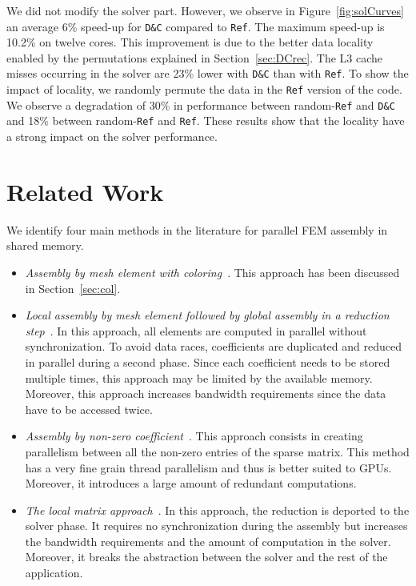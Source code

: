 \documentclass[10pt]{IOS-Book-Article}
\begin{document}
We did not modify the solver part.
However, we observe in Figure~\ref{fig:solCurves} an average 6\% speed-up for {\tt D\&C} compared to {\tt Ref}.
The maximum speed-up is 10.2\% on twelve cores.
This improvement is due to the better data locality enabled by the permutations explained in Section~\ref{sec:DCrec}.
The L3 cache misses occurring in the solver are 23\% lower with {\tt D\&C} than with {\tt Ref}.
To show the impact of locality, we randomly permute the data in the {\tt Ref} version of the code. We observe a degradation of 30\% in performance between random-{\tt Ref} and {\tt D\&C} and  18\% between random-{\tt Ref} and {\tt Ref}.
These results show that the locality have a strong impact on the solver performance.



\section{Related Work}
\label{sec:rw}

We identify four main methods in the literature for parallel FEM assembly in shared memory.

\begin{itemize}

\item \textit{Assembly by mesh element with coloring}~\cite{CPUfe}. This approach has been discussed in Section~\ref{sec:col}.

\item \textit{Local assembly by mesh element followed by global assembly in a reduction step}~\cite{cecka2011assembly}.
In this approach, all elements are computed in parallel without synchronization. To avoid data races, coefficients are duplicated
and reduced in parallel during a second phase. Since each coefficient needs to be stored multiple times, this approach may be
limited by the available memory. Moreover, this approach increases bandwidth requirements since the data have to be accessed twice.

\item \textit{Assembly by non-zero coefficient}~\cite{bolz2003sparse,cecka2011assembly}. This approach consists in creating parallelism
between all the non-zero entries of the sparse matrix. This method has a very fine grain thread parallelism
and thus is better suited to GPUs. Moreover, it introduces a large amount of redundant computations.

\item \textit{The local matrix approach}~\cite{CPUGPUasm}. In this approach, the reduction is deported to the solver phase. It
requires no synchronization during the assembly but increases the bandwidth requirements and the amount of computation in the solver.
Moreover, it breaks the abstraction between the solver and the rest of the application.

\end{itemize}
\end{document}
